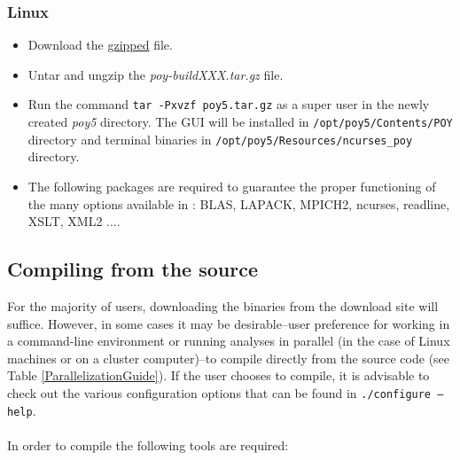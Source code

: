 \begin{flushleft}
\begin{minipage}[t]{0.88\textwidth}
	   	\subsubsection*{Linux}
	\end{minipage}
		\begin{itemize}
			\item  Download the 
    \href{http://research.amnh.org/scicomp/projects/poy.php}{gzipped} file.
    			\item Untar and ungzip the \emph{poy-buildXXX.tar.gz} file.
			\item Run the command \texttt{tar -Pxvzf poy5.tar.gz} as a
    super user in the newly created \emph{poy5} directory.
    The GUI will be installed in \texttt{/opt/poy5/Contents/POY} directory
    and terminal binaries in \texttt{/opt/poy5/Resources/ncurses\_poy} directory.
    			\item The following packages are required to guarantee the proper functioning of the many options available in \poy: BLAS, LAPACK, MPICH2, ncurses, readline, XSLT, XML2 ....
		\end{itemize} 

\end{flushleft}

\subsection{Compiling from the source}

For the majority of users, downloading the binaries from the \poy download site will suffice.  However, in some cases it may be %
 desirable--user preference for working in a command-line environment or running \poy analyses in parallel (in the case of Linux machines or on a cluster computer)--to compile \poy directly from the source code (see Table %
  \ref{ParallelizationGuide}). If the user chooses to compile, it is advisable to check out the various configuration options that can be found in {\tt ./configure --help}. \\
\\
In order to compile \poy the following tools are required:


